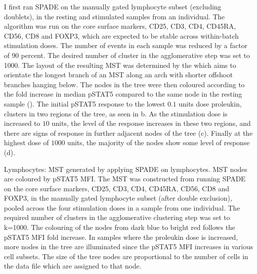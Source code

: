 I first ran \gls{SPADE} on the manually gated lymphocyte subset (excluding doublets),
in the resting and stimulated samples from an individual.
The algorithm was run on the core surface markers, CD25, CD3, CD4, CD45RA, CD56, CD8 and FOXP3,
which are expected to be stable across within-batch stimulation doses.
The number of events in each sample was reduced by a factor of 90 percent.
The desired number of cluster in the agglomerative step was set to 1000.
The layout of the resulting \gls{MST} was determined by the 
which aims to orientate the longest branch of an \gls{MST} along an arch with shorter offshoot branches hanging below.
The nodes in the tree were then coloured according to the fold increase in median pSTAT5 compared to the same node
in the resting sample ().
The initial pSTAT5 response to the lowest $0.1$ units dose proleukin, clusters in two regions of the tree,
as seen in b.
As the stimulation dose is increased to $10$ units, the level of the response increases in these two regions,
and there are signs of response in further adjacent nodes of the tree (c).
Finally at the highest dose of $1000$ units, the majority of the nodes show some level of response (d).

{Lymphocytes: \gls{MST} generated by applying \gls{SPADE} on lymphocytes. \gls{MST} nodes are coloured by pSTAT5 \gls{MFI}.}
{
  The \gls{MST} was constructed from running \gls{SPADE} on the core surface markers,
  CD25, CD3, CD4, CD45RA, CD56, CD8 and FOXP3, in the manually gated lymphocyte subset (after double exclusion),
  pooled across the four stimulation doses in a sample from one individual.
  The required number of clusters in the agglomerative clustering step was set to k=1000.
  The colouring of the nodes from dark blue to bright red follows the pSTAT5 MFI fold increase.
  In samples where the proleukin dose is increased, more nodes in the tree are illuminated since the pSTAT5 MFI increases in various cell subsets.
  The size of the tree nodes are proportional to the number of cells in the data file which are assigned to that node.
}

